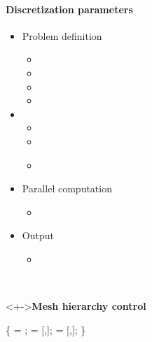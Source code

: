 
\begin{frame}[fragile] 
\secframetitle{\ssParameters}
\framesubtitle{Discretization parameters}
\vspace{-0.2in}
\begin{minipage}[t]{1.7in}
\begin{itemize}
\item Problem definition
  \begin{itemize}
  \item {}
  \item {}
  \item {}
  \item {}
  \end{itemize}
\item {}
  \begin{itemize}
  \item {}
  \item {}
  \item \textcolor{green!50!black}{}
  \end{itemize}
\item Parallel computation
  \begin{itemize}
  \item {}
  \end{itemize}
\item Output
  \begin{itemize}
    \item {}
  \end{itemize}
\end{itemize}
\end{minipage} \
\begin{minipage}[t]{2.6in}
\vspace{-0.2in}
\begin{block}<+->{\textbf{Mesh hierarchy control}}
  \footnotesize \vspace{-0.1in}
\begin{semiverbatim}
 \{ 
      = ;
      = [,];
    = [,\valuetext{4}];
\}
\end{semiverbatim}
\begin{semiverbatim}
\end{semiverbatim}
\end{block}
\end{minipage}
\end{frame}

